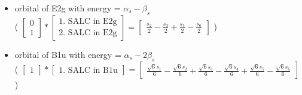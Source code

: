 \documentclass[12pt,a4paper]{article}
\begin{document}
\begin{itemize}
\item orbital of E2g with energy = $\alpha_{s} - \beta_{s}$ \\
                            ( $\left[\begin{matrix}0\\1\end{matrix}\right] * \left[\begin{array}{c}\text{1. SALC in E2g} \\ \text{2. SALC in E2g}\end{array}\right] = \left[\begin{matrix}\frac{s_{2}}{2} - \frac{s_{3}}{2} + \frac{s_{5}}{2} - \frac{s_{6}}{2}\end{matrix}\right] $ )
\item orbital of B1u with energy = $\alpha_{s} - 2 \beta_{s}$ \\
                            ( $\left[\begin{matrix}1\end{matrix}\right] * \left[\begin{array}{c}\text{1. SALC in B1u}\end{array}\right] = \left[\begin{matrix}\frac{\sqrt{6} s_{1}}{6} - \frac{\sqrt{6} s_{2}}{6} + \frac{\sqrt{6} s_{3}}{6} - \frac{\sqrt{6} s_{4}}{6} + \frac{\sqrt{6} s_{5}}{6} - \frac{\sqrt{6} s_{6}}{6}\end{matrix}\right] $ )
\end{itemize}
\end{document}
